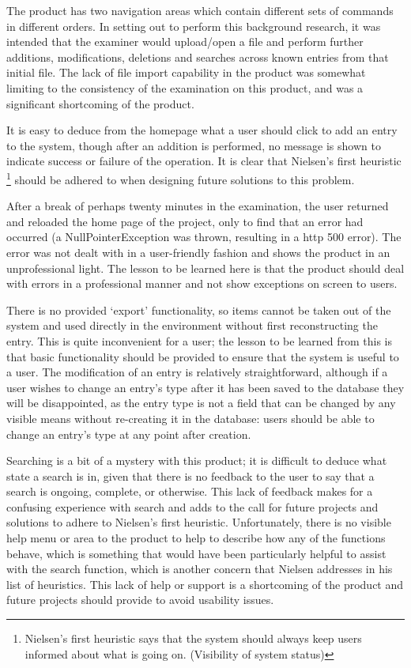 The product has two navigation areas which contain different sets of commands in different orders. 
In setting out to perform this background research, it was intended that the examiner would upload/open a file and perform further additions, modifications, deletions and searches across known entries from that initial file.  The lack of file import capability in the product was somewhat limiting to the consistency of the examination on this product, and was a significant shortcoming of the product. 

It is easy to deduce from the homepage what a user should click to add an entry to the system, though after an addition is performed, no message is shown to indicate success or failure of the operation.  It is clear that Nielsen's first heuristic \cite{NielsenHeuristics}\footnote{\label{nielsenH1} Nielsen's first heuristic says that the system should always keep users informed about what is going on. (Visibility of system status)} should be adhered to when designing future solutions to this problem.%

After a break of perhaps twenty minutes in the examination, the user returned and reloaded the home page of the project, only to find that an error had occurred (a NullPointerException was thrown, resulting in a \gls{http} 500 error).  The error was not dealt with in a user-friendly fashion and shows the product in an unprofessional light.  The lesson to be learned here is that the product should deal with errors in a professional manner and not show exceptions on screen to users.

There is no provided `export' functionality, so items cannot be taken out of the system and used directly in the \bibtex{} environment without first reconstructing the entry.  This is quite inconvenient for a user; the lesson to be learned from this is that basic functionality should be provided to ensure that the system is useful to a user.
The modification of an entry is relatively straightforward, although if a user wishes to change an entry's type after it has been saved to the database they will be disappointed, as the entry type is not a field that can be changed by any visible means without re-creating it in the database: users should be able to change an entry's type at any point after creation.

Searching is a bit of a mystery with this product; it is difficult to deduce what state a search is in, given that there is no feedback to the user to say that a search is ongoing, complete, or otherwise.  This lack of feedback makes for a confusing experience with search and adds to the call for future projects and solutions to adhere to Nielsen's first heuristic. Unfortunately, there is no visible help menu or area to the product to help to describe how any of the functions behave, which is something that would have been particularly helpful to assist with the search function, which is another concern that Nielsen addresses in his list of heuristics.  This lack of help or support is a shortcoming of the product and future projects should provide to avoid usability issues.

